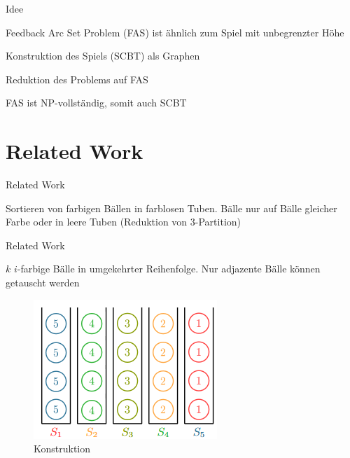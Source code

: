 \documentclass{beamer}
\begin{document}
\begin{frame}{Idee}
	\begin{pointlist}
		\item Feedback Arc Set Problem (FAS) ist ähnlich zum Spiel mit unbegrenzter Höhe
		\item Konstruktion des Spiels (SCBT) als Graphen 
		\item Reduktion des Problems auf FAS
		\item FAS ist NP-vollständig, somit auch SCBT
	\end{pointlist}
\end{frame}

\section*{Related Work}
\begin{frame}{Related Work}
	\begin{pointlist}
		\item Sortieren von farbigen Bällen in farblosen Tuben. Bälle nur auf Bälle gleicher Farbe oder in leere Tuben (Reduktion von 3-Partition)
	\end{pointlist}
\end{frame}

\begin{frame}{Related Work}
	\begin{pointlist}
		\item $k$ $i$-farbige Bälle in umgekehrter Reihenfolge. Nur adjazente Bälle können getauscht werden 
	\end{pointlist}
	\begin{figure}[ht]
		\includegraphics[width=.65\textwidth]{relatedwork}
		\caption{Konstruktion}
    \end{figure}
\end{frame}
\end{document}
